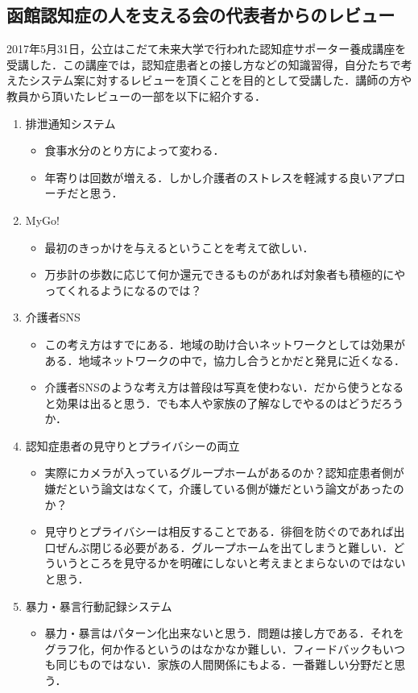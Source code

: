 \documentclass[../report]{subfiles}
\begin{document}
\subsection{函館認知症の人を支える会の代表者からのレビュー}
2017年5月31日，公立はこだて未来大学で行われた認知症サポーター養成講座を受講した．この講座では，認知症患者との接し方などの知識習得，自分たちで考えたシステム案に対するレビューを頂くことを目的として受講した．講師の方や教員から頂いたレビューの一部を以下に紹介する．
\begin{enumerate}
    \item 排泄通知システム
        \begin{itemize}
            \item 食事水分のとり方によって変わる．
            \item 年寄りは回数が増える．しかし介護者のストレスを軽減する良いアプローチだと思う．
        \end{itemize}
    \item MyGo!
        \begin{itemize}
            \item 最初のきっかけを与えるということを考えて欲しい．
            \item 万歩計の歩数に応じて何か還元できるものがあれば対象者も積極的にやってくれるようになるのでは？
        \end{itemize}
    \item 介護者SNS
        \begin{itemize}
            \item この考え方はすでにある．地域の助け合いネットワークとしては効果がある．地域ネットワークの中で，協力し合うとかだと発見に近くなる．
            \item 介護者SNSのような考え方は普段は写真を使わない．だから使うとなると効果は出ると思う．でも本人や家族の了解なしでやるのはどうだろうか．
        \end{itemize}
    \item 認知症患者の見守りとプライバシーの両立
        \begin{itemize}
            \item 実際にカメラが入っているグループホームがあるのか？認知症患者側が嫌だという論文はなくて，介護している側が嫌だという論文があったのか？
            \item 見守りとプライバシーは相反することである．徘徊を防ぐのであれば出口ぜんぶ閉じる必要がある．グループホームを出てしまうと難しい．どういうところを見守るかを明確にしないと考えまとまらないのではないと思う．
        \end{itemize}
    \item 暴力・暴言行動記録システム
        \begin{itemize}
            \item 暴力・暴言はパターン化出来ないと思う．問題は接し方である．それをグラフ化，何か作るというのはなかなか難しい．フィードバックもいつも同じものではない．家族の人間関係にもよる．一番難しい分野だと思う．
        \end{itemize}
\end{enumerate}
\end{document}
